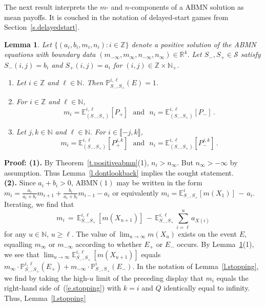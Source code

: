 \documentclass[letterpaper,11pt,oneside,reqno]{amsbook}
\newcommand{\PP}{\ensuremath{\mathbb{P}}}
\newcommand{\N}{\ensuremath{\mathbb{N}}}
\newcommand{\R}{\ensuremath{\mathbb{R}}}
\newcommand{\Z}{\ensuremath{\mathbb{Z}}}
\newcommand{\E}[0]{\mathbb{E}}
\numberwithin{figure}{chapter}
\newtheorem{lemma}[theorem]{Lemma}
\theoremstyle{definition}
\theoremstyle{definition}
\theoremstyle{definition}
\theoremstyle{definition}
\theoremstyle{definition}
\newcommand{\mc}{\mathcal}
\newcommand{\nwithzero}{\N}
\newcommand{\nwithoutzero}{\N_+}
\newcommand\pgameplay[3]{\PP^{#3}_{#1,#2}}
\newcommand\egameplay[3]{\E^{#3}_{#1,#2}}
\newcommand{\abmnmac}{\textrm{ABMN}}
\newcommand{\abmnmacspace}{\textrm{ABMN} }
\begin{document}
The next result interprets the $m$- and $n$-components of a \abmnmacspace solution as mean payoffs. It is couched in the notation of delayed-start games from Section~\ref{s.delayedstart}.
\begin{lemma}\label{l.minipayoff}
Let $\big\{ (a_i,b_i,m_i,n_i) : i \in \Z \big\}$ denote a positive 
solution of the \abmnmacspace equations
with boundary data $(m_{-\infty},m_\infty,n_{-\infty},n_\infty) \in \R^4$.
Let $S_-,S_+ \in \mc{S}$ satisfy
$S_-(i,j) = b_i$ and $S_+(i,j) = a_i$ for $(i,j) \in \Z \times \nwithoutzero$.
\begin{enumerate}
\item 
Let $i \in \Z$ and $\ell \in \nwithzero$. Then $\pgameplay{S_-}{S_+}{i,\ell}(E) =1$.
\item 
 For $i \in \Z$  and $\ell \in \nwithzero$,
$$
m_i = \E_{(S_-,S_+)}^{i,\ell}[P_+]  \, \, \, \, \textrm{and} \, \, \, \, 
n_i =   \E_{(S_-,S_+)}^{i,\ell}  [P_-]  \, .  
$$
\item Let $j,k \in \nwithzero$  and $\ell \in \nwithzero$. For $i \in \llbracket -j,k \rrbracket$,
$$
 m_i =  \E_{(S_-,S_+)}^{i,\ell}  [P^{j,k}_+]   \, \, \, \, \textrm{and} \, \, \, \, 
 n_i =  \E_{(S_-,S_+)}^{i,\ell}  [P^{j,k}_-]  \, .
$$
\end{enumerate}
\end{lemma}
{\bf Proof: (1).}  By Theorem~\ref{t.positiveabmn}(1), $n_i > n_\infty$. But $n_\infty > -\infty$ by assumption. Thus Lemma~\ref{l.dontlookback} implies the sought statement. \\
{\bf (2).} Since $a_i + b_i>0$, $\abmnmac(1)$ may be written in the form
 $m_i =  \tfrac{a_i}{a_i+b_i}m_{i+1} +  \tfrac{b_i}{a_i+b_i}m_{i-1} - a_i$ 
 or equivalently 
 $m_i = \egameplay{S_-}{S_+}{i} [m(X_1)] \, - \, a_i$.
 Iterating, we find that  
 \begin{equation}\label{e.mexpand}
 m_i \, = \, \egameplay{S_-}{S_+}{i,\ell} \, [m(X_{u+1})] \, - \,  \egameplay{S_-}{S_+}{i,\ell} \, \sum_{i=\ell}^u a_{X(i)} 
 \end{equation}
 for any $u \in \nwithzero$, $u \geq \ell$.
 The value of $\lim_{u \to \infty} m(X_u)$ exists on the event $E$, equalling $m_\infty$ or $m_{-\infty}$ according to whether $E_+$ or $E_-$ occurs. By Lemma~\ref{l.minipayoff}(1),
 we see that   $\lim_{u \to \infty} \egameplay{S_-}{S_+}{i,\ell} \, [ m(X_{u+1})]$ equals $m_\infty  \cdot \pgameplay{S_-}{S_+}{i,\ell} (E_+) + m_{-\infty} \cdot  \pgameplay{S_-}{S_+}{i} (E_-)$.
  In the notation of Lemma~\ref{l.stopping}, we find by taking the high-$u$ limit of the preceding display that $m_i$ equals the right-hand side of~(\ref{e.stopping}) with $k=i$ and $Q$ identically equal to infinity. Thus, Lemma~\ref{l.stopping}
\end{document}
